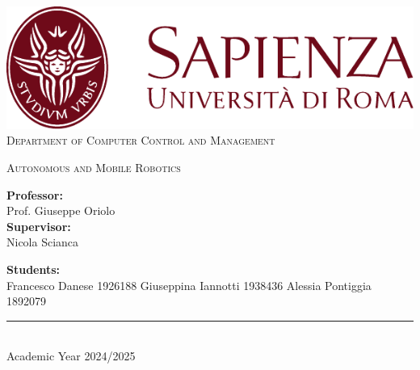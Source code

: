 \begin{titlepage}
	\centering
    \vspace*{0.5 cm}
    \includegraphics[scale = 0.75]{figures/SapienzaLogo.pdf}\\[1.0 cm]	%

    \vspace*{-0.4cm}
    \textsc{\large Department of Computer Control and Management}\\[2.0 cm]	%
    \vspace*{1cm}

    { \fontsize{20.74pt}{18.5pt}\selectfont\bfseries \thetitle \par } %

    \vspace*{0.25cm}
    \textsc{\Large Autonomous and Mobile Robotics}\\[0.5 cm] %

    \vspace*{2.6cm}
	\begin{minipage}[t]{0.45\textwidth}
		\begin{flushleft} \large
			\textbf{Professor:}\\
			Prof. Giuseppe Oriolo\\
			\textbf{Supervisor:}\\
			Nicola Scianca
		\end{flushleft}
	\end{minipage}
	\hspace{1cm}
	\begin{minipage}[t]{0.45\textwidth}
		\begin{flushleft} \large
			\textbf{Students:}\\
			Francesco Danese 1926188
			Giuseppina Iannotti 1938436
			Alessia Pontiggia 1892079
		\end{flushleft}
	\end{minipage}

    \vspace{3cm}

    \rule{\linewidth}{0.2 mm} \\[0.3 cm]
    \vspace*{-0.2cm}
    Academic Year 2024/2025
\end{titlepage}

